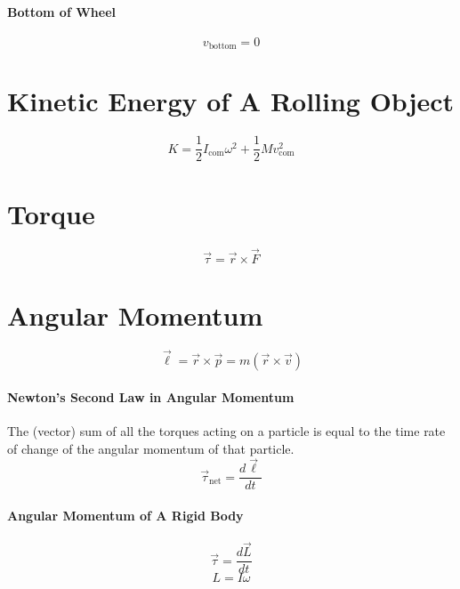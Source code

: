 \documentclass{article}
\begin{document}
        \paragraph{Bottom of Wheel}
        \begin{equation}
            v_\text{bottom} = 0
        \end{equation}

    \section{Kinetic Energy of A Rolling Object}

        \begin{equation}
            K = \frac{1}{2} I_\text{com} \omega^2 + \frac{1}{2} M v_\text{com}^2
        \end{equation}

    \section{Torque}

        \begin{equation}
            \vec{\tau} = \vec{r} \times \vec{F}
        \end{equation}

    \section{Angular Momentum}

        \begin{equation}
            \vec{\ell} = \vec{r} \times \vec{p} = m \left( \vec{r} \times \vec{v} \right)
        \end{equation}

        \paragraph{Newton's Second Law in Angular Momentum}
        The (vector) sum of all the torques acting on a particle is equal to the time rate of change of the angular momentum of that particle.
        \begin{equation}
            \vec{\tau}_\text{net} = \frac{d\vec{\ell}}{dt}
        \end{equation}

        \paragraph{Angular Momentum of A Rigid Body}
        \begin{equation}
            \vec{\tau} = \frac{d\vec{L}}{dt}
        \end{equation}
        \begin{equation}
            L = I \omega
        \end{equation}
\end{document}
